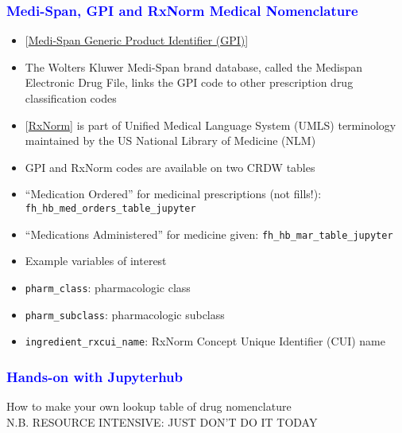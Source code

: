 \documentclass[11pt,pdftex,dvipsnames,usenames]{beamer}
\begin{document}
\begin{frame}[fragile]\frametitle{\bf\textcolor{blue}{Medi-Span, GPI and RxNorm
Medical Nomenclature}}
\begin{itemize}
\item \textcolor{PineGreen}{[\href{https://www.wolterskluwer.com/en/solutions/medi-span/about/gpi}
{Medi-Span Generic Product Identifier (GPI)}]}
\item The Wolters Kluwer Medi-Span brand database, called the Medispan
  Electronic Drug File, links the GPI code to other prescription drug
  classification codes
\item \textcolor{PineGreen}{[\href{https://www.nlm.nih.gov/research/umls/rxnorm/index.html}{RxNorm}]} is part of Unified Medical Language System (UMLS)
  terminology maintained by the US National Library
  of Medicine (NLM)
\item GPI and RxNorm codes are available on two CRDW tables
\item ``Medication Ordered'' for medicinal prescriptions (not fills!): \texttt{fh\_hb\_med\_orders\_table\_jupyter}
\item ``Medications Administered'' for medicine given: \texttt{fh\_hb\_mar\_table\_jupyter} 
\item Example variables of interest
\item \texttt{pharm\_class}: pharmacologic class
\item \texttt{pharm\_subclass}: pharmacologic subclass
\item \texttt{ingredient\_rxcui\_name}: RxNorm Concept Unique Identifier (CUI) name
\end{itemize}
\end{frame}

\begin{frame}[fragile]\frametitle{\bf\textcolor{blue}{Hands-on with Jupyterhub}}
How to make your own lookup table of drug nomenclature\\ 
N.B. RESOURCE INTENSIVE: JUST DON'T DO IT TODAY

\end{frame}
\end{document}
